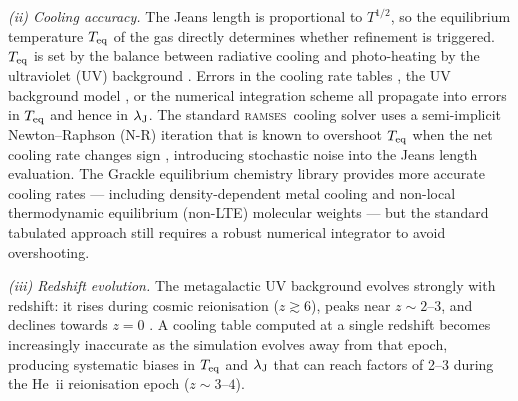 \documentclass[fleqn,usenatbib]{mnras}
\newcommand{\lJ}{\lambda_{\rm J}}
\newcommand{\ramses}{\textsc{ramses}}
\begin{document}
\textit{(ii) Cooling accuracy.}  The Jeans length is proportional to
$T^{1/2}$, so the equilibrium temperature $T_{\rm eq}$ of the gas
directly determines whether refinement is triggered.  $T_{\rm eq}$ is
set by the balance between radiative cooling and photo-heating by the
ultraviolet (UV) background \citep{HM2012, FG2020}.  Errors in the
cooling rate tables \citep{Sutherland1993, Ferland2017}, the UV
background model \citep{Courty2004}, or the numerical integration
scheme all propagate into errors in $T_{\rm eq}$ and hence in $\lJ$.
The standard \ramses\ cooling solver uses a semi-implicit
Newton--Raphson (N-R) iteration that is known to overshoot $T_{\rm eq}$
when the net cooling rate changes sign
\citep[cf.][]{Townsend2009}, introducing stochastic noise into the
Jeans length evaluation.  The Grackle equilibrium chemistry library
\citep{Smith2017} provides more accurate cooling rates --- including
density-dependent metal cooling and non-local thermodynamic
equilibrium (non-LTE) molecular weights --- but the standard tabulated
approach still requires a robust numerical integrator to avoid
overshooting.

\textit{(iii) Redshift evolution.}  The metagalactic UV background
evolves strongly with redshift: it rises during cosmic reionisation
($z \gtrsim 6$), peaks near $z \sim 2$--$3$, and declines towards
$z = 0$ \citep{HM2012, FG2020}.  A cooling table computed at a single
redshift becomes increasingly inaccurate as the simulation evolves
away from that epoch, producing systematic biases in $T_{\rm eq}$ and
$\lJ$ that can reach factors of 2--3 during the He~{\sc ii}
reionisation epoch ($z \sim 3$--$4$).
\end{document}
